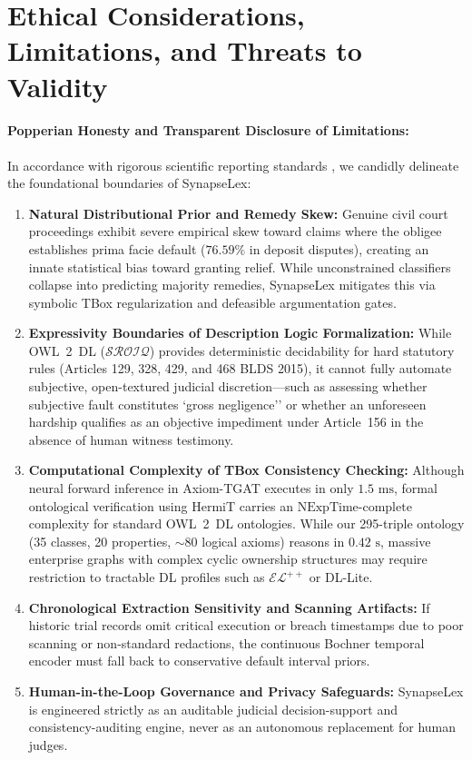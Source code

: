 \documentclass[11pt,a4paper]{article}
\begin{document}
\section{Ethical Considerations, Limitations, and Threats to Validity}
\label{sec:limitations}

\paragraph{Popperian Honesty and Transparent Disclosure of Limitations:} In accordance with rigorous scientific reporting standards \citep{popper2005logic}, we candidly delineate the foundational boundaries of SynapseLex:
\begin{enumerate}[label=(\roman*)]
    \item \textbf{Natural Distributional Prior and Remedy Skew:} Genuine civil court proceedings exhibit severe empirical skew toward claims where the obligee establishes prima facie default ($76.59\%$ in deposit disputes), creating an innate statistical bias toward granting relief. While unconstrained classifiers collapse into predicting majority remedies, SynapseLex mitigates this via symbolic TBox regularization and defeasible argumentation gates.
    \item \textbf{Expressivity Boundaries of Description Logic Formalization:} While OWL~2~DL ($\mathcal{SROIQ}$) provides deterministic decidability for hard statutory rules (Articles 129, 328, 429, and 468 BLDS 2015), it cannot fully automate subjective, open-textured judicial discretion---such as assessing whether subjective fault constitutes `gross negligence'' or whether an unforeseen hardship qualifies as an objective impediment under Article~156 in the absence of human witness testimony.
    \item \textbf{Computational Complexity of TBox Consistency Checking:} Although neural forward inference in Axiom-TGAT executes in only $1.5\text{ ms}$, formal ontological verification using HermiT carries an $\text{NExpTime-complete}$ complexity for standard OWL~2~DL ontologies. While our 295-triple ontology (35 classes, 20 properties, $\sim$80 logical axioms) reasons in $0.42\text{ s}$, massive enterprise graphs with complex cyclic ownership structures may require restriction to tractable DL profiles such as $\mathcal{EL}^{++}$ or DL-Lite.
    \item \textbf{Chronological Extraction Sensitivity and Scanning Artifacts:} If historic trial records omit critical execution or breach timestamps due to poor scanning or non-standard redactions, the continuous Bochner temporal encoder must fall back to conservative default interval priors.
    \item \textbf{Human-in-the-Loop Governance and Privacy Safeguards:} SynapseLex is engineered strictly as an auditable judicial decision-support and consistency-auditing engine, never as an autonomous replacement for human judges.
\end{enumerate}
\end{document}
